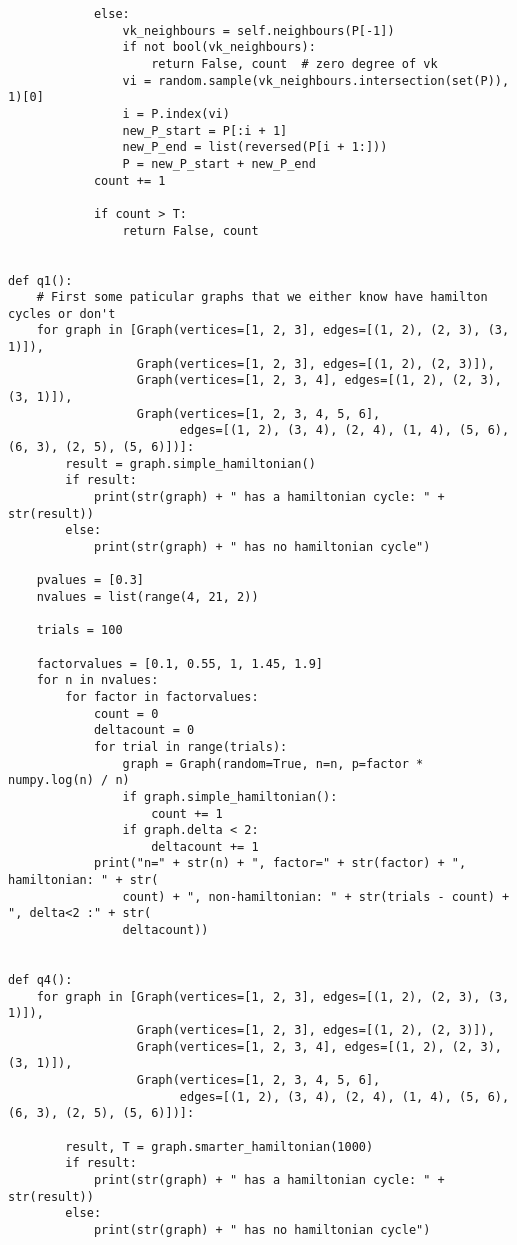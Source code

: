 \documentclass[10pt,a4paper]{report}
\begin{document}
\begin{verbatim}
            else:
                vk_neighbours = self.neighbours(P[-1])
                if not bool(vk_neighbours):
                    return False, count  # zero degree of vk
                vi = random.sample(vk_neighbours.intersection(set(P)), 1)[0]
                i = P.index(vi)
                new_P_start = P[:i + 1]
                new_P_end = list(reversed(P[i + 1:]))
                P = new_P_start + new_P_end
            count += 1

            if count > T:
                return False, count


def q1():
    # First some paticular graphs that we either know have hamilton cycles or don't
    for graph in [Graph(vertices=[1, 2, 3], edges=[(1, 2), (2, 3), (3, 1)]),
                  Graph(vertices=[1, 2, 3], edges=[(1, 2), (2, 3)]),
                  Graph(vertices=[1, 2, 3, 4], edges=[(1, 2), (2, 3), (3, 1)]),
                  Graph(vertices=[1, 2, 3, 4, 5, 6],
                        edges=[(1, 2), (3, 4), (2, 4), (1, 4), (5, 6), (6, 3), (2, 5), (5, 6)])]:
        result = graph.simple_hamiltonian()
        if result:
            print(str(graph) + " has a hamiltonian cycle: " + str(result))
        else:
            print(str(graph) + " has no hamiltonian cycle")

    pvalues = [0.3]
    nvalues = list(range(4, 21, 2))

    trials = 100

    factorvalues = [0.1, 0.55, 1, 1.45, 1.9]
    for n in nvalues:
        for factor in factorvalues:
            count = 0
            deltacount = 0
            for trial in range(trials):
                graph = Graph(random=True, n=n, p=factor * numpy.log(n) / n)
                if graph.simple_hamiltonian():
                    count += 1
                if graph.delta < 2:
                    deltacount += 1
            print("n=" + str(n) + ", factor=" + str(factor) + ", hamiltonian: " + str(
                count) + ", non-hamiltonian: " + str(trials - count) + ", delta<2 :" + str(
                deltacount))


def q4():
    for graph in [Graph(vertices=[1, 2, 3], edges=[(1, 2), (2, 3), (3, 1)]),
                  Graph(vertices=[1, 2, 3], edges=[(1, 2), (2, 3)]),
                  Graph(vertices=[1, 2, 3, 4], edges=[(1, 2), (2, 3), (3, 1)]),
                  Graph(vertices=[1, 2, 3, 4, 5, 6],
                        edges=[(1, 2), (3, 4), (2, 4), (1, 4), (5, 6), (6, 3), (2, 5), (5, 6)])]:

        result, T = graph.smarter_hamiltonian(1000)
        if result:
            print(str(graph) + " has a hamiltonian cycle: " + str(result))
        else:
            print(str(graph) + " has no hamiltonian cycle")


\end{verbatim}
\end{document}
